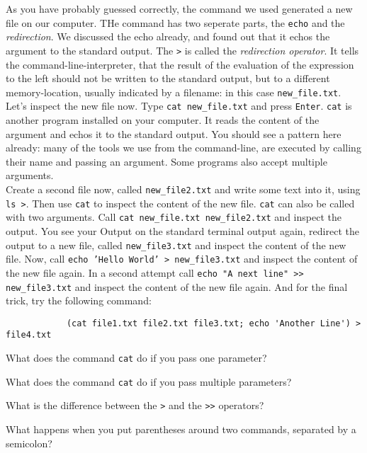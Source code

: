 \begin{challenge}
    \begin{task}
        As you have probably guessed correctly, the command we used generated a new file on our computer.
        THe command has two seperate parts, the \texttt{echo} and the \textit{redirection}.
        We discussed the echo already, and found out that it echos the argument to the standard output.
        The \texttt{>} is called the \textit{redirection operator}.
        It tells the command-line-interpreter, that the result of the evaluation of the expression to the left should not be written to the standard output, but to a different memory-location, usually indicated by a filename: in this case \texttt{new_file.txt}.
        Let's inspect the new file now.
        Type \texttt{cat new_file.txt} and press \texttt{Enter}.
        \texttt{cat} is another program installed on your computer.
        It reads the content of the argument and echos it to the standard output.
        You should see a pattern here already: many of the tools we use from the command-line, are executed by calling their name and passing an argument.
        Some programs also accept multiple arguments.\\
        Create a second file now, called \texttt{new_file2.txt} and write some text into it, using \texttt{ls >}.
        Then use \texttt{cat} to inspect the content of the new file.
        \texttt{cat} can also be called with two arguments. 
        Call \texttt{cat new_file.txt new_file2.txt} and inspect the output.
        You see your Output on the standard terminal output again, redirect the output to a new file, called \texttt{new_file3.txt} and inspect the content of the new file.
        Now, call \texttt{echo 'Hello World' > new_file3.txt} and inspect the content of the new file again.
        In a second attempt call \texttt{echo "A next line" >> new_file3.txt} and inspect the content of the new file again.
        And for the final trick, try the following command:
        \begin{lstlisting}
            (cat file1.txt file2.txt file3.txt; echo 'Another Line') > file4.txt
        \end{lstlisting}
        \begin{questions}
            \item What does the command \texttt{cat} do if you pass one parameter?
            \item What does the command \texttt{cat} do if you pass multiple parameters?
            \item What is the difference between the \texttt{>} and the \texttt{>>} operators?
            \item What happens when you put parentheses around two commands, separated by a semicolon?
        \end{questions}
    \end{task}


\end{challenge}
